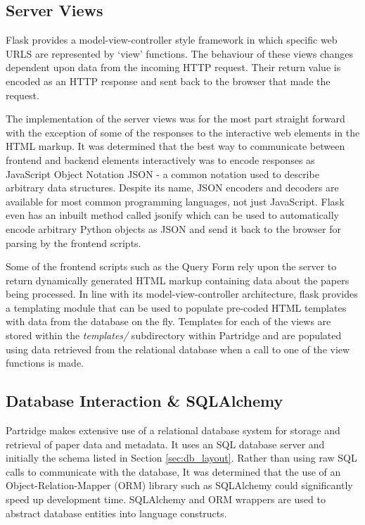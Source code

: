 \subsection{ Server Views }

Flask provides a model-view-controller style framework in which specific web
URLS are represented by `view' functions. The behaviour of these views changes
dependent upon data from the incoming HTTP request. Their return value is
encoded as an HTTP response and sent back to the browser that made the request.

The implementation of the server views was for the most part straight forward
with the exception of some of the responses to the interactive web elements in
the HTML markup. It was determined that the best way to communicate between
frontend and backend elements interactively was to encode responses as
JavaScript Object Notation JSON - a common notation used to describe arbitrary
data structures\cite{jsonRFC}. Despite its name, JSON encoders and decoders are
available for most common programming languages, not just JavaScript.  Flask
even has an inbuilt method called jsonify which can be used to automatically
encode arbitrary Python objects as JSON and send it back to the browser for
parsing by the frontend scripts\cite{flask2012}.

Some of the frontend scripts such as the Query Form rely upon the server to
return dynamically generated HTML markup containing data about the papers being
processed. In line with its model-view-controller architecture, flask provides
a templating module that can be used to populate pre-coded HTML templates with
data from the database on the fly. Templates for each of the views are stored
within the \emph{templates/} subdirectory within Partridge and are populated
using data retrieved from the relational database when a call to one of the
view functions is made\cite{flask2012}.

\subsection{Database Interaction \& SQLAlchemy}

Partridge makes extensive use of a relational database system for storage and
retrieval of paper data and metadata. It uses an SQL database server and
initially the schema listed in Section \ref{sec:db_layout}. Rather than using
raw SQL calls to communicate with the database, It was determined that the use
of an Object-Relation-Mapper (ORM) library such as SQLAlchemy could
significantly speed up development time. SQLAlchemy and ORM wrappers are used
to abstract database entities into language constructs. 


